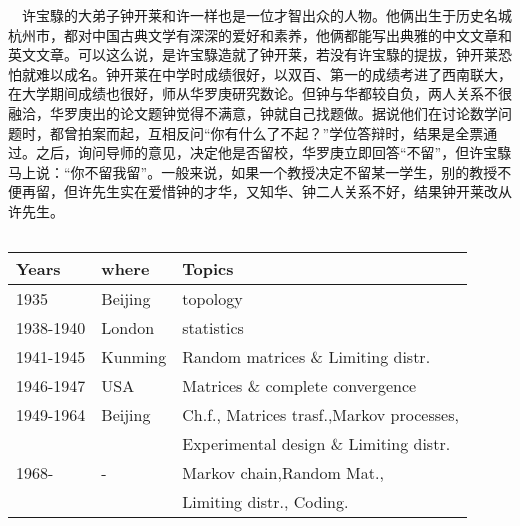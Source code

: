 \documentclass[a4paper,AutoFakeBold,oneside,12pt]{article}
\begin{document}
$\quad$许宝騄的大弟子钟开莱和许一样也是一位才智出众的人物。他俩出生于历史名城杭州市，都对中国古典文学有深深的爱好和素养，他俩都能写出典雅的中文文章和英文文章。可以这么说，是许宝騄造就了钟开莱，若没有许宝騄的提拔，钟开莱恐怕就难以成名。钟开莱在中学时成绩很好，以双百、第一的成绩考进了西南联大，在大学期间成绩也很好，师从华罗庚研究数论。但钟与华都较自负，两人关系不很融洽，华罗庚出的论文题钟觉得不满意，钟就自己找题做。据说他们在讨论数学问题时，都曾拍案而起，互相反问“你有什么了不起？”学位答辩时，结果是全票通过。之后，询问导师的意见，决定他是否留校，华罗庚立即回答“不留”，但许宝騄马上说：“你不留我留”。一般来说，如果一个教授决定不留某一学生，别的教授不便再留，但许先生实在爱惜钟的才华，又知华、钟二人关系不好，结果钟开莱改从许先生。


$\quad$\begin{tabular}{|l|l|l|}
	\hline Years & where & Topics  \\
	\hline 1935 & Beijing & topology \\
	\hline 1938-1940 & London & statistics\\
	\hline 1941-1945 & Kunming & Random matrices \& Limiting distr.\\
	\hline 1946-1947 & USA & Matrices \& complete convergence \\
	\hline 1949-1964 & Beijing & Ch.f., Matrices trasf.,Markov processes, \\
	\hline & &  Experimental design \& Limiting distr. \\
	\hline 1968- & - & Markov chain,Random Mat.,\\
	\hline & & Limiting distr., Coding. \\
	\hline
\end{tabular}
\end{document}
